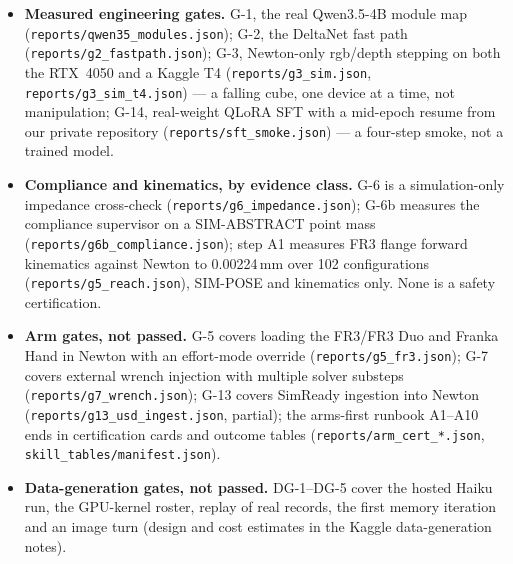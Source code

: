 \begin{itemize}[leftmargin=*,itemsep=1pt]
\item \textbf{Measured engineering gates.} G-1, the real Qwen3.5-4B module map (\texttt{reports/qwen35\_modules.json}); G-2, the DeltaNet fast path (\texttt{reports/g2\_fastpath.json}); G-3, Newton-only rgb/depth stepping on both the RTX~4050 and a Kaggle T4 (\texttt{reports/g3\_sim.json}, \texttt{reports/g3\_sim\_t4.json}) --- a falling cube, one device at a time, not manipulation; G-14, real-weight QLoRA SFT with a mid-epoch resume from our private repository (\texttt{reports/sft\_smoke.json}) --- a four-step smoke, not a trained model.
\item \textbf{Compliance and kinematics, by evidence class.} G-6 is a simulation-only impedance cross-check (\texttt{reports/g6\_impedance.json}); G-6b measures the compliance supervisor on a SIM-ABSTRACT point mass (\texttt{reports/g6b\_compliance.json}); step A1 measures FR3 flange forward kinematics against Newton to 0.00224\,mm over 102 configurations (\texttt{reports/g5\_reach.json}), SIM-POSE and kinematics only. None is a safety certification.
\item \textbf{Arm gates, not passed.} G-5 covers loading the FR3/FR3 Duo and Franka Hand in Newton with an effort-mode override (\texttt{reports/g5\_fr3.json}); G-7 covers external wrench injection with multiple solver substeps (\texttt{reports/g7\_wrench.json}); G-13 covers SimReady ingestion into Newton (\texttt{reports/g13\_usd\_ingest.json}, partial); the arms-first runbook A1--A10 ends in certification cards and outcome tables (\texttt{reports/arm\_cert\_*.json}, \texttt{skill\_tables/manifest.json}). 
\item \textbf{Data-generation gates, not passed.} DG-1--DG-5 cover the hosted Haiku run, the GPU-kernel roster, replay of real records, the first memory iteration and an image turn (design and cost estimates in the Kaggle data-generation notes). 
\end{itemize}

